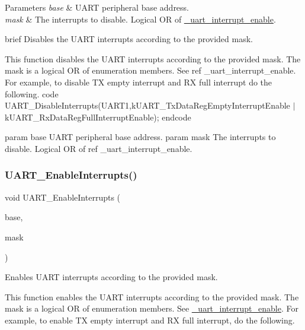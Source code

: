 \begin{DoxyParams}{Parameters}
{\em base} & U\+A\+RT peripheral base address. \\
\hline
{\em mask} & The interrupts to disable. Logical OR of \mbox{\hyperlink{group__uart__driver_ga700f3cd8e3800273a1591307cab6311c}{\+\_\+uart\+\_\+interrupt\+\_\+enable}}.\\
\hline
\end{DoxyParams}
brief Disables the U\+A\+RT interrupts according to the provided mask.

This function disables the U\+A\+RT interrupts according to the provided mask. The mask is a logical OR of enumeration members. See ref \+\_\+uart\+\_\+interrupt\+\_\+enable. For example, to disable TX empty interrupt and RX full interrupt do the following. code U\+A\+R\+T\+\_\+\+Disable\+Interrupts(U\+A\+R\+T1,k\+U\+A\+R\+T\+\_\+\+Tx\+Data\+Reg\+Empty\+Interrupt\+Enable $\vert$ k\+U\+A\+R\+T\+\_\+\+Rx\+Data\+Reg\+Full\+Interrupt\+Enable); endcode

param base U\+A\+RT peripheral base address. param mask The interrupts to disable. Logical OR of ref \+\_\+uart\+\_\+interrupt\+\_\+enable. \mbox{\label{group__uart__driver_ga49ecd761481a22956e3f46285038719c}} 
\subsubsection{\texorpdfstring{UART\_EnableInterrupts()}{UART\_EnableInterrupts()}}
{\footnotesize\ttfamily void U\+A\+R\+T\+\_\+\+Enable\+Interrupts (\begin{DoxyParamCaption}\item[{\mbox{\hyperlink{struct_u_a_r_t___type}{U\+A\+R\+T\+\_\+\+Type}} $\ast$}]{base,  }\item[{uint32\+\_\+t}]{mask }\end{DoxyParamCaption})}



Enables U\+A\+RT interrupts according to the provided mask. 

This function enables the U\+A\+RT interrupts according to the provided mask. The mask is a logical OR of enumeration members. See \mbox{\hyperlink{group__uart__driver_ga700f3cd8e3800273a1591307cab6311c}{\+\_\+uart\+\_\+interrupt\+\_\+enable}}. For example, to enable TX empty interrupt and RX full interrupt, do the following. 
\begin{DoxyCode}{0}
\end{DoxyCode}




